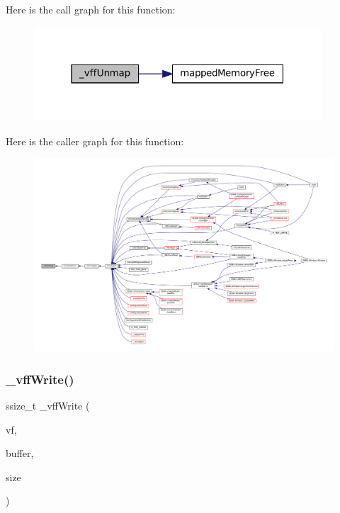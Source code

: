 Here is the call graph for this function\+:
\nopagebreak
\begin{figure}[H]
\begin{center}
\leavevmode
\includegraphics[width=304pt]{vfs-file_8c_a359856c1b2b58f1cb08c962ff0bbd6f7_cgraph}
\end{center}
\end{figure}
Here is the caller graph for this function\+:
\nopagebreak
\begin{figure}[H]
\begin{center}
\leavevmode
\includegraphics[width=350pt]{vfs-file_8c_a359856c1b2b58f1cb08c962ff0bbd6f7_icgraph}
\end{center}
\end{figure}
\mbox{\label{vfs-file_8c_addc171631afec453d709b1a6f2fff3cb}} 
\subsubsection{\texorpdfstring{\+\_\+vff\+Write()}{\_vffWrite()}}
{\footnotesize\ttfamily ssize\+\_\+t \+\_\+vff\+Write (\begin{DoxyParamCaption}\item[{struct V\+File $\ast$}]{vf,  }\item[{const void $\ast$}]{buffer,  }\item[{size\+\_\+t}]{size }\end{DoxyParamCaption})\hspace{0.3cm}{\ttfamily [static]}}

